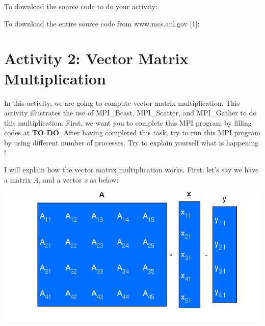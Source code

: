 \documentclass[letterpaper,10pt,openany,oneside]{sphinxmanual}
\begin{document}
To download the source code to do your activity:

To download the entire source code from www.mcs.anl.gov {[}1{]}:


\section{Activity 2: Vector Matrix Multiplication}
\label{CompileAndActivity/compileandactivity:activity-2-vector-matrix-multiplication}
In this activity, we are going to compute vector matrix multiplication. This activity illustrates the use of MPI\_Bcast, MPI\_Scatter, and MPI\_Gather to do this multiplication. First, we want you to complete this MPI program by filling codes at \textbf{TO DO}. After having completed this task, try to run this MPI program by using different number of processes. Try to explain yourself what is happening !

I will explain how the vector matrix multiplication works. First, let's say we have a matrix \emph{A}, and a vector \emph{x} as below:

{\hfill\includegraphics{vector_matrix_multi.png}\hfill}
\end{document}
